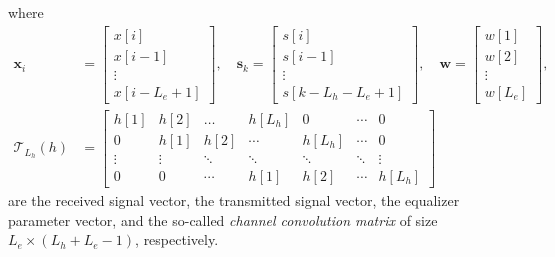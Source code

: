 where
\begin{align}
\bm{x}_i&=\begin{bmatrix}x[i]\\ x[i-1]\\ \vdots\\ x[i-L_e+1]\end{bmatrix},\quad \bm{s}_k = \begin{bmatrix}s[i]\\ s[i-1]\\ \vdots\\ s[k-L_h-L_e+1]\end{bmatrix},\quad \bm{w}=\begin{bmatrix}w[1]\\w[2]\\ \vdots\\ w[L_e]\end{bmatrix},\\
\mathcal{T}_{L_h}(h)&=\begin{bmatrix}
h[1]  & h[2]   & \ldots & h[L_h] & 0     & \cdots & 0 \\
0     & h[1]   & h[2]   & \cdots & h[L_h]& \cdots & 0 \\
\vdots& \vdots & \ddots & \ddots &\ddots & \ddots & \vdots\\
0     & 0      & \cdots &  h[1]  & h[2]  & \cdots & h[L_h]
\end{bmatrix} \label{eqn:signalmodeldesc_siso}
\end{align}
are the received signal vector, the transmitted signal vector, the equalizer parameter vector, and the so-called \emph{channel convolution matrix} of size $L_e \times (L_h+L_e-1)$, respectively.

